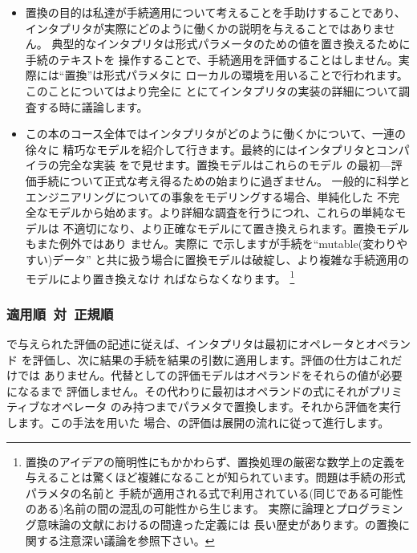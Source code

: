 \begin{itemize}

\item
置換の目的は私達が手続適用について考えることを手助けすることであり、
インタプリタが実際にどのように働くかの説明を与えることではありません。
典型的なインタプリタは形式パラメータのための値を置き換えるために手続のテキストを
操作することで、手続適用を評価することはしません。実際には``置換''は形式パラメタに
ローカルの環境を用いることで行われます。このことについてはより完全に
とにてインタプリタの実装の詳細について調査する時に議論します。

\item
この本のコース全体ではインタプリタがどのように働くかについて、一連の徐々に
精巧なモデルを紹介して行きます。最終的にはインタプリタとコンパイラの完全な実装
をで見せます。置換モデルはこれらのモデル
の最初---評価手続について正式な考え得るための始まりに過ぎません。
一般的に科学とエンジニアリングについての事象をモデリングする場合、単純化した
不完全なモデルから始めます。より詳細な調査を行うにつれ、これらの単純なモデルは
不適切になり、より正確なモデルにて置き換えられます。置換モデルもまた例外ではあり
ません。実際に で示しますが手続を``mutable(変わりやすい)データ''
と共に扱う場合に置換モデルは破綻し、より複雑な手続適用のモデルにより置き換えなけ
ればならなくなります。
\footnote{置換のアイデアの簡明性にもかかわらず、置換処理の厳密な数学上の定義を
与えることは驚くほど複雑になることが知られています。問題は手続の形式パラメタの名前と
手続が適用される式で利用されている(同じである可能性のある)名前の間の混乱の可能性から生じます。
実際に論理とプログラミング意味論の文献におけるの間違った定義には
長い歴史があります。の置換に関する注意深い議論を参照下さい。}

\end{itemize}

\subsubsection*{適用順~対~正規順}
で与えられた評価の記述に従えば、インタプリタは最初にオペレータとオペランド
を評価し、次に結果の手続を結果の引数に適用します。評価の仕方はこれだけでは
ありません。代替としての評価モデルはオペランドをそれらの値が必要になるまで
評価しません。その代わりに最初はオペランドの式にそれがプリミティブなオペレータ
のみ持つまでパラメタで置換します。それから評価を実行します。この手法を用いた
場合、の評価は展開の流れに従って進行します。

